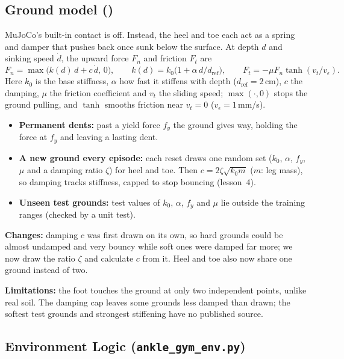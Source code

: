 \documentclass[10pt,a4paper]{article}
\newcommand{\code}[1]{\texttt{\detokenize{#1}}}
\begin{document}
\subsection{Ground model (\code{ground.py})}
MuJoCo's built-in contact is off. Instead, the heel and toe each act as a spring and damper that pushes back once sunk below the surface. At depth $d$ and sinking speed $\dot d$, the upward force $F_n$ and friction $F_t$ are
\begin{equation*}
F_n=\max\!\big(k(d)\,d+c\,\dot d,\,0\big),\qquad k(d)=k_0\big(1+\alpha\, d/d_{\mathrm{ref}}\big),\qquad F_t=-\mu F_n\tanh(v_t/v_\epsilon).
\end{equation*}
Here $k_0$ is the base stiffness, $\alpha$ how fast it stiffens with depth ($d_{\mathrm{ref}}=2$\,cm), $c$ the damping, $\mu$ the friction coefficient and $v_t$ the sliding speed; $\max(\cdot,0)$ stops the ground pulling, and $\tanh$ smooths friction near $v_t=0$ ($v_\epsilon=1$\,mm/s).
\begin{itemize}
\item \textbf{Permanent dents:} past a yield force $f_y$ the ground gives way, holding the force at $f_y$ and leaving a lasting dent.
\item \textbf{A new ground every episode:} each reset draws one random set ($k_0$, $\alpha$, $f_y$, $\mu$ and a damping ratio $\zeta$) for heel and toe. Then $c=2\zeta\sqrt{k_0 m}$ ($m$: leg mass), so damping tracks stiffness, capped to stop bouncing (lesson~4).
\item \textbf{Unseen test grounds:} test values of $k_0$, $\alpha$, $f_y$ and $\mu$ lie outside the training ranges (checked by a unit test).
\end{itemize}
\textbf{Changes:} damping $c$ was first drawn on its own, so hard grounds could be almost undamped and very bouncy while soft ones were damped far more; we now draw the ratio $\zeta$ and calculate $c$ from it. Heel and toe also now share one ground instead of two.

\textbf{Limitations:} the foot touches the ground at only two independent points, unlike real soil. The damping cap leaves some grounds less damped than drawn; the softest test grounds and strongest stiffening have no published source.

\subsection{Environment Logic (\texttt{ankle\_gym\_env.py})}
 
\end{document}
